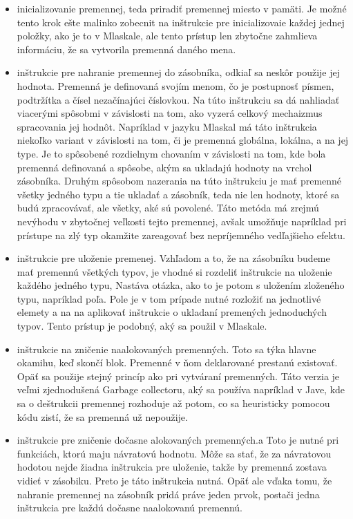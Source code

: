 \begin{itemize}
\item inicializovanie premennej, teda priradiť premennej miesto v pamäti. Je možné tento krok ešte malinko zobecnit na inštrukcie pre inicializovaie každej jednej položky, ako je to v Mlaskale, ale tento prístup len zbytočne zahmlieva informáciu, že sa vytvorila premenná daného mena.
\item inštrukcie pre nahranie premennej do zásobníka, odkiaľ sa neskôr použije jej hodnota. Premenná je definovaná svojím menom, čo je postupnosť písmen, podtržítka a čísel nezačínajúci číslovkou. Na túto inštrukciu sa dá nahliadať viacerými spôsobmi v závislosti na tom, ako vyzerá celkový mechaizmus spracovania jej hodnôt. Napríklad v jazyku Mlaskal\cite{mlaskal} má táto inštrukcia niekoľko variant v závislosti na tom, či je premenná globálna, lokálna, a na jej type. Je to spôsobené rozdielnym chovaním v závislosti na tom, kde bola premenná definovaná a spôsobe, akým sa ukladajú hodnoty na vrchol zásobníka. Druhým spôsobom nazerania na túto inštrukciu je mať premenné všetky jedného typu a tie ukladať a zásobník, teda nie len hodnoty, ktoré sa budú zpracovávať, ale všetky, aké sú povolené. Táto metóda má zrejmú nevýhodu v zbytočnej veľkosti tejto premennej, avšak umožňuje napríklad pri prístupe na zlý typ okamžite zareagovať bez nepríjemného vedľajšieho efektu.
\item inštrukcie pre uloženie premenej. Vzhľadom a to, že na zásobníku budeme mať premennú všetkých typov, je vhodné si rozdeliť inštrukcie na uloženie každého jedného typu, Nastáva otázka, ako to je potom s uložením zloženého typu, napríklad poľa. Pole je v tom prípade nutné rozložiť na jednotlivé elemety a na na aplikovať inštrukcie o ukladaní premených jednoduchých typov. Tento prístup je podobný, aký sa použil v Mlaskale.
\item inštrukcie  na zničenie naalokovaných premenných. Toto sa týka hlavne okamihu, keď skončí blok. Premenné v ňom deklarované prestanú existovať. Opäť sa použije stejný princíp ako pri vytváraní premenných. Táto verzia je veľmi zjednodušená Garbage collectoru, aký sa používa napríklad v Jave, kde sa o deštrukcii premennej rozhoduje až potom, co sa heuristicky pomocou kódu zistí, že sa premenná už nepoužije.
\item inštrukcie pre zničenie dočasne alokovaných premenných.a Toto je nutné pri funkciách, ktorú maju návratovú hodnotu. Môže sa stať, že za návratovou hodotou nejde žiadna inštrukcia pre uloženie, takže by premenná zostava vidieť v zásobiku. Preto je táto inštrukcia nutná. Opäť ale vďaka tomu, že nahranie premennej na zásobník pridá práve jeden prvok, postači jedna inštrukcia pre každú dočasne naalokovanú premennú.

\end{itemize}
